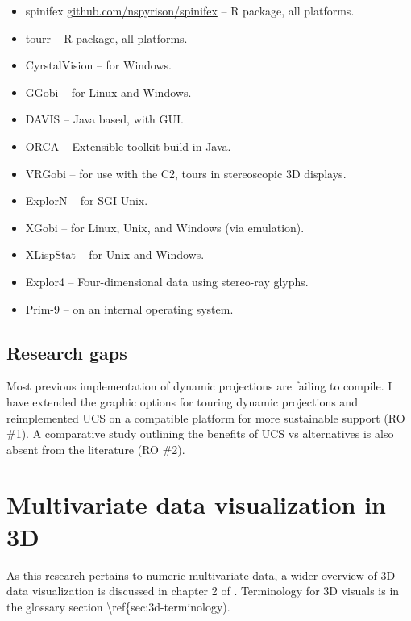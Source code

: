\documentclass{monashthesis}
\begin{document}
\begin{itemize}
\tightlist
\item
  spinifex
  \href{https://github.com/nspyrison/spinifex}{github.com/nspyrison/spinifex}
  -- R package, all platforms.
\item
  tourr \autocite{wickham_tourr_2011} -- R package, all platforms.
\item
  CyrstalVision \autocite{wegman_visual_2003} -- for Windows.
\item
  GGobi \autocite{swayne_ggobi:_2003} -- for Linux and Windows.
\item
  DAVIS \autocite{huh_davis:_2002} -- Java based, with GUI.
\item
  ORCA \autocite{sutherland_orca:_2000} -- Extensible toolkit build in
  Java.
\item
  VRGobi \autocite{nelson_xgobi_1998} -- for use with the C2, tours in
  stereoscopic 3D displays.
\item
  ExplorN \autocite{carr_explorn:_1996} -- for SGI Unix.
\item
  XGobi \autocite{swayne_xgobi:_1991} -- for Linux, Unix, and Windows
  (via emulation).
\item
  XLispStat \autocite{tierney_lisp-stat:_1990} -- for Unix and Windows.
\item
  Explor4 \autocite{carr_explor4:_1988} -- Four-dimensional data using
  stereo-ray glyphs.
\item
  Prim-9 \autocites{asimov_grand_1985}{fisherkeller_prim-9:_1974} -- on
  an internal operating system.
\end{itemize}

\subsection{Research gaps}\label{research-gaps}

Most previous implementation of dynamic projections are failing to
compile. I have extended the graphic options for touring dynamic
projections and reimplemented UCS on a compatible platform for more
sustainable support (RO \#1). A comparative study outlining the benefits
of UCS vs alternatives is also absent from the literature (RO \#2).

\section{Multivariate data visualization in 3D}\label{sec:3d}

As this research pertains to numeric multivariate data, a wider overview
of 3D data visualization is discussed in chapter 2 of
\textcite{marriott_immersive_2018}. Terminology for 3D visuals is in the
glossary section \textbackslash{}ref\{sec:3d-terminology).
\end{document}
